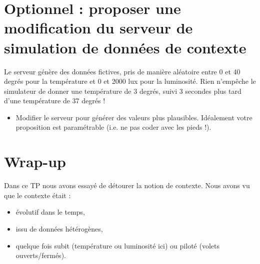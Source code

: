\documentclass[a4paper,11pt,fleqn]{article}
\begin{document}
\section{Optionnel : proposer une modification du serveur de simulation de données de contexte}
Le serveur génère des données fictives, pris de manière aléatoire entre 0 et 40 degrés pour la température et 0 et 2000 lux pour la luminosité. Rien n'empêche le simulateur de donner une température de 3 degrés, suivi 3 secondes plus tard d'une température de 37 degrés !
\begin{itemize}
 \item Modifier le serveur pour générer des valeurs plus plausibles. Idéalement votre proposition est paramétrable (i.e. ne pas coder avec les pieds !).
\end{itemize}


%


\section{Wrap-up}

Dans ce TP nous avons essayé de détourer la notion de contexte. Nous avons vu que le contexte était :
\begin{itemize}
	\item évolutif dans le temps,
	\item issu de données hétérogènes,
	\item quelque fois subit (température ou luminosité ici) ou piloté (volets ouverts/fermés).
\end{itemize}
\end{document}

